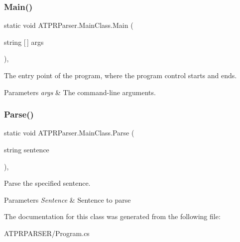 \subsubsection{\texorpdfstring{Main()}{Main()}}
{\footnotesize\ttfamily static void A\+T\+P\+R\+Parser.\+Main\+Class.\+Main (\begin{DoxyParamCaption}\item[{string \mbox{[}$\,$\mbox{]}}]{args }\end{DoxyParamCaption})\hspace{0.3cm}{\ttfamily [inline]}, {\ttfamily [static]}}



The entry point of the program, where the program control starts and ends. 


\begin{DoxyParams}{Parameters}
{\em args} & The command-\/line arguments.\\
\hline
\end{DoxyParams}
\hypertarget{class_a_t_p_r_parser_1_1_main_class_af792fa155ddd2ec39f158270b2dae720}{}\label{class_a_t_p_r_parser_1_1_main_class_af792fa155ddd2ec39f158270b2dae720} 
\subsubsection{\texorpdfstring{Parse()}{Parse()}}
{\footnotesize\ttfamily static void A\+T\+P\+R\+Parser.\+Main\+Class.\+Parse (\begin{DoxyParamCaption}\item[{string}]{sentence }\end{DoxyParamCaption})\hspace{0.3cm}{\ttfamily [inline]}, {\ttfamily [static]}}



Parse the specified sentence. 


\begin{DoxyParams}{Parameters}
{\em Sentence} & Sentence to parse\\
\hline
\end{DoxyParams}


The documentation for this class was generated from the following file\+:\begin{DoxyCompactItemize}
\item 
A\+T\+P\+R\+P\+A\+R\+S\+E\+R/Program.\+cs\end{DoxyCompactItemize}
